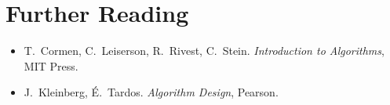 \section*{Further Reading}
\begin{itemize}
  \item T.~Cormen, C.~Leiserson, R.~Rivest, C.~Stein. \emph{Introduction to Algorithms}, MIT Press.
  \item J.~Kleinberg, \'E.~Tardos. \emph{Algorithm Design}, Pearson.
\end{itemize}

